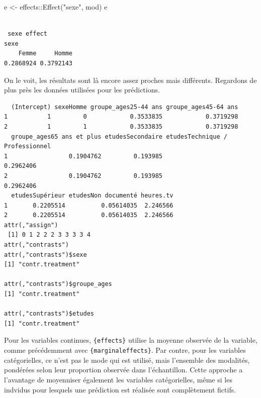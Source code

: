 \documentclass[
  letterpaper,
  DIV=11,
  numbers=noendperiod,
  oneside]{scrreprt}
\newenvironment{Shaded}{\begin{snugshade}}{\end{snugshade}}
\newcommand{\FunctionTok}[1]{\textcolor[rgb]{0.28,0.35,0.67}{#1}}
\newcommand{\NormalTok}[1]{\textcolor[rgb]{0.00,0.23,0.31}{#1}}
\newcommand{\OtherTok}[1]{\textcolor[rgb]{0.00,0.23,0.31}{#1}}
\newcommand{\SpecialCharTok}[1]{\textcolor[rgb]{0.37,0.37,0.37}{#1}}
\newcommand{\StringTok}[1]{\textcolor[rgb]{0.13,0.47,0.30}{#1}}
\begin{document}
\begin{Shaded}
\begin{Highlighting}[]
\NormalTok{e }\OtherTok{\textless{}{-}}\NormalTok{ effects}\SpecialCharTok{::}\FunctionTok{Effect}\NormalTok{(}\StringTok{"sexe"}\NormalTok{, mod)}
\NormalTok{e}
\end{Highlighting}
\end{Shaded}

\begin{verbatim}

 sexe effect
sexe
    Femme     Homme 
0.2868924 0.3792143 
\end{verbatim}

On le voit, les résultats sont là encore assez proches mais différents.
Regardons de plus près les données utilisées pour les prédictions.

\begin{Shaded}
\end{Shaded}

\begin{verbatim}
  (Intercept) sexeHomme groupe_ages25-44 ans groupe_ages45-64 ans
1           1         0            0.3533835            0.3719298
2           1         1            0.3533835            0.3719298
  groupe_ages65 ans et plus etudesSecondaire etudesTechnique / Professionnel
1                 0.1904762         0.193985                       0.2962406
2                 0.1904762         0.193985                       0.2962406
  etudesSupérieur etudesNon documenté heures.tv
1       0.2205514          0.05614035  2.246566
2       0.2205514          0.05614035  2.246566
attr(,"assign")
 [1] 0 1 2 2 2 3 3 3 3 4
attr(,"contrasts")
attr(,"contrasts")$sexe
[1] "contr.treatment"

attr(,"contrasts")$groupe_ages
[1] "contr.treatment"

attr(,"contrasts")$etudes
[1] "contr.treatment"
\end{verbatim}

Pour les variables continues, \texttt{\{effects\}} utilise la moyenne
observée de la variable, comme précédemment avec
\texttt{\{marginaleffects\}}. Par contre, pour les variables
catégorielles, ce n'est pas le mode qui est utilisé, mais l'ensemble des
modalités, pondérées selon leur proportion observée dans l'échantillon.
Cette approche a l'avantage de moyenniser également les variables
catégorielles, même si les indvidus pour lesquels une prédiction est
réalisée sont complètement fictifs.
\end{document}
